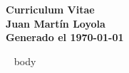 \documentclass[11pt,spanish]{article}
\begin{document}

\begin{center}
\huge\bf\color{maingrey} Curriculum Vitae \\
\Huge\bf\color{maincolor} Juan Martín Loyola \\
\vspace{3mm}
\small \color{maingrey} Generado el \today
\end{center}


~{{ body }}~
\end{document}
